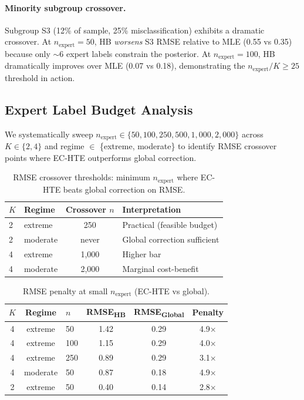 \documentclass[11pt,a4paper]{article}
\begin{document}
\paragraph{Minority subgroup crossover.}
Subgroup S3 (12\% of sample, 25\% misclassification) exhibits a dramatic crossover.
At $n_{\text{expert}} = 50$, HB \emph{worsens} S3 RMSE relative to MLE (0.55 vs 0.35) because only $\sim$6 expert labels constrain the posterior.
At $n_{\text{expert}} = 100$, HB dramatically improves over MLE (0.07 vs 0.18), demonstrating the $n_{\text{expert}}/K \geq 25$ threshold in action.


\subsection{Expert Label Budget Analysis}\label{sec:budget}

We systematically sweep $n_{\text{expert}} \in \{50, 100, 250, 500, 1{,}000, 2{,}000\}$ across $K \in \{2, 4\}$ and regime $\in$ \{extreme, moderate\} to identify RMSE crossover points where EC-HTE outperforms global correction.

\begin{table}[t]
\centering
\small
\caption{RMSE crossover thresholds: minimum $n_{\text{expert}}$ where EC-HTE beats global correction on RMSE.}
\label{tab:crossover}
\begin{tabular}{@{}llcl@{}}
\toprule
$K$ & Regime & Crossover $n$ & Interpretation \\
\midrule
2 & extreme & 250 & Practical (feasible budget) \\
2 & moderate & never & Global correction sufficient \\
4 & extreme & 1{,}000 & Higher bar \\
4 & moderate & 2{,}000 & Marginal cost-benefit \\
\bottomrule
\end{tabular}
\end{table}

\begin{table}[t]
\centering
\small
\caption{RMSE penalty at small $n_{\text{expert}}$ (EC-HTE vs global).}
\label{tab:penalty}
\begin{tabular}{@{}cclccc@{}}
\toprule
$K$ & Regime & $n$ & RMSE\textsubscript{HB} & RMSE\textsubscript{Global} & Penalty \\
\midrule
4 & extreme & 50 & 1.42 & 0.29 & 4.9$\times$ \\
4 & extreme & 100 & 1.15 & 0.29 & 4.0$\times$ \\
4 & extreme & 250 & 0.89 & 0.29 & 3.1$\times$ \\
4 & moderate & 50 & 0.87 & 0.18 & 4.9$\times$ \\
2 & extreme & 50 & 0.40 & 0.14 & 2.8$\times$ \\
\bottomrule
\end{tabular}
\end{table}
\end{document}
